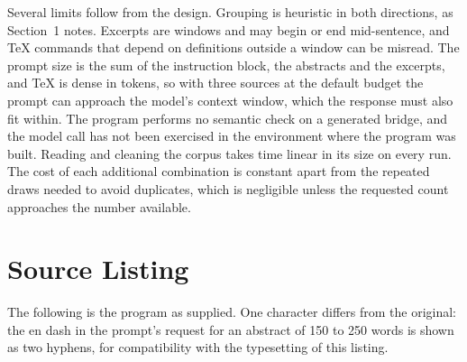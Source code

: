 \documentclass[11pt]{article}
\begin{document}
Several limits follow from the design. Grouping is heuristic in both directions, as Section~1 notes. Excerpts are windows and may begin or end mid-sentence, and \TeX{} commands that depend on definitions outside a window can be misread. The prompt size is the sum of the instruction block, the abstracts and the excerpts, and \TeX{} is dense in tokens, so with three sources at the default budget the prompt can approach the model's context window, which the response must also fit within. The program performs no semantic check on a generated bridge, and the model call has not been exercised in the environment where the program was built. Reading and cleaning the corpus takes time linear in its size on every run. The cost of each additional combination is constant apart from the repeated draws needed to avoid duplicates, which is negligible unless the requested count approaches the number available.

\section{Source Listing}\label{app:source}

The following is the program as supplied. One character differs from the original: the en dash in the prompt's request for an abstract of 150 to 250 words is shown as two hyphens, for compatibility with the typesetting of this listing.
\end{document}
